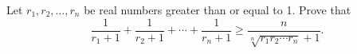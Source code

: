 Let $r_1, r_2, \ldots, r_n$ be real numbers greater than or equal to 1. Prove that
\[ \frac{1}{r_1+1} + \frac{1}{r_2+1} + \cdots + \frac{1}{r_n+1} \geq \frac{n}{\sqrt[n]{r_1 r_2 \cdots r_n}+1}. \]
